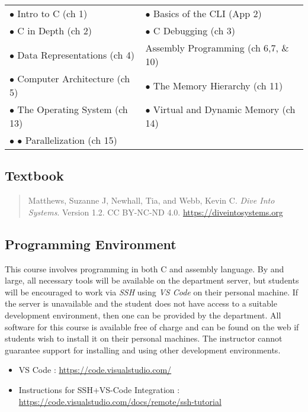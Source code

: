 \documentclass[10pt]{article}
\begin{document}
\begin{center}
\begin{tabular}{ll}
\(\bullet\) Intro to C (ch 1) & \(\bullet\) Basics of the CLI (App 2) \\
\(\bullet\) C in Depth (ch 2) & \(\bullet\) C Debugging (ch 3) \\
\(\bullet\) Data Representations (ch 4) & Assembly Programming (ch 6,7, \& 10) \\
\(\bullet\) Computer Architecture (ch 5) & \(\bullet\) The Memory Hierarchy (ch 11) \\
\(\bullet\) The Operating System (ch 13) & \(\bullet\) Virtual and Dynamic Memory (ch 14) \\
\(\bullet\) \(\bullet\) Parallelization (ch 15) & \\
\end{tabular}
\end{center}

\subsection{Textbook}

\begin{quote}
Matthews, Suzanne J, Newhall, Tia, and Webb, Kevin C.
\textit{Dive Into Systems}. Version 1.2. CC BY-NC-ND 4.0.
\url{https://diveintosystems.org}
\end{quote}


\subsection{Programming Environment}

This course involves programming in both C and assembly language. By and large, all
necessary tools will be available on the department server, but students will be encouraged to work via \textit{SSH} using \textit{VS Code} on their personal machine.  If the server is unavailable and the student does not have access to a suitable development environment, then one can be provided by the department. All software for this course is available free of charge and can be found on the web if students wish to install it on their personal machines. The instructor cannot guarantee support for installing and using other development environments.

\begin{itemize}
  \item VS Code : \url{https://code.visualstudio.com/}
  \item Instructions for SSH+VS-Code Integration : \url{https://code.visualstudio.com/docs/remote/ssh-tutorial}
\end{itemize}
\end{document}
